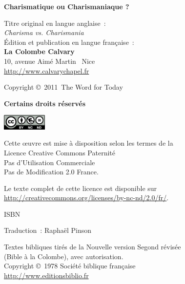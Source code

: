 \newpage
\mbox{}
\vfill

{\scriptsize

{\bfseries Charismatique ou Charismaniaque ?}

Titre original en langue anglaise~:\\
\emph{Charisma vs. Charismania} \\

Édition et publication en langue française~:\\
 {\bfseries La Colombe Calvary}\\
 10, avenue Aimé Martin ~Nice\\
 \url{http://www.calvarychapel.fr}

Copyright \copyright{}~2011~The Word for Today

{\bfseries Certains droits réservés}

\includegraphics[width=6em]{by-nc-nd_eu}

Cette \oe{}uvre est mise à disposition selon les termes de la \\
 Licence Creative Commons Paternité \\
 \ocadr Pas d'Utilisation Commerciale \\
 \ocadr Pas de Modification 2.0 France.

Le texte complet de cette licence est disponible sur \\
 \url{http://creativecommons.org/licenses/by-nc-nd/2.0/fr/}.

ISBN~\isbn

Traduction~: Raphaël Pinson

Textes bibliques tirés de la Nouvelle version Segond révisée \\
 (Bible à la Colombe), avec autorisation. \\
 Copyright \copyright{}~1978 Société biblique française \\
 \url{http://www.editionsbiblio.fr}

}
\enlargethispage{\footskip}


